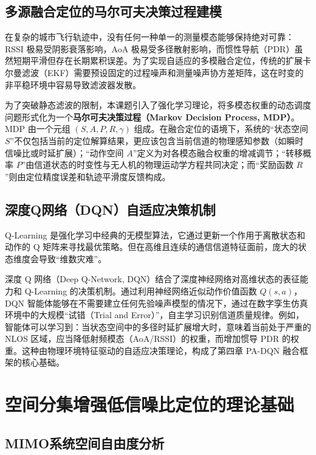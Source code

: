 \subsection{多源融合定位的马尔可夫决策过程建模}

在复杂的城市飞行轨迹中，没有任何一种单一的测量模态能够保持绝对可靠：RSSI 极易受阴影衰落影响，AoA 极易受多径散射影响，而惯性导航（PDR）虽然短期平滑但存在长期累积误差。为了实现自适应的多模融合定位，传统的扩展卡尔曼滤波（EKF）需要预设固定的过程噪声和测量噪声协方差矩阵，这在时变的非平稳环境中容易导致滤波器发散。

为了突破静态滤波的限制，本课题引入了强化学习理论，将多模态权重的动态调度问题形式化为一个\textbf{马尔可夫决策过程（Markov Decision Process, MDP）}。MDP 由一个元组 $(S, A, P, R, \gamma)$ 组成。在融合定位的语境下，系统的“状态空间 $S$”不仅包括当前的定位解算结果，更应该包含当前信道的物理感知参数（如瞬时信噪比或时延扩展）；“动作空间 $A$”定义为对各模态融合权重的增减调节；“转移概率 $P$”由信道状态的时变性与无人机的物理运动学方程共同决定；而“奖励函数 $R$”则由定位精度误差和轨迹平滑度反馈构成。

\subsection{深度Q网络（DQN）自适应决策机制}

Q-Learning 是强化学习中经典的无模型算法，它通过更新一个作用于离散状态和动作的 Q 矩阵来寻找最优策略。但在高维且连续的通信信道特征面前，庞大的状态维度会导致“维数灾难”。

深度 Q 网络（Deep Q-Network, DQN）结合了深度神经网络对高维状态的表征能力和 Q-Learning 的决策机制。通过利用神经网络近似动作价值函数 $Q(s,a)$，DQN 智能体能够在不需要建立任何先验噪声模型的情况下，通过在数字孪生仿真环境中的大规模“试错（Trial and Error）”，自主学习识别信道质量规律。例如，智能体可以学习到：当状态空间中的多径时延扩展增大时，意味着当前处于严重的 NLOS 区域，应当降低射频模态（AoA/RSSI）的权重，而增加惯导 PDR 的权重。这种由物理环境特征驱动的自适应决策理论，构成了第四章 PA-DQN 融合框架的核心基础。

\section{空间分集增强低信噪比定位的理论基础}

\subsection{MIMO系统空间自由度分析}

